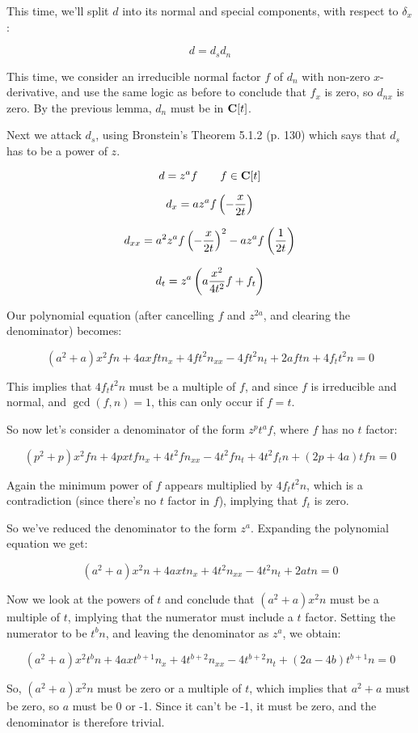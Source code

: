 \documentclass{article}
\newcommand{\C}{\ensuremath{{\bf C}}}
\begin{document}
This time, we'll split $d$ into its normal and special components,
with respect to $\delta_x$:

$$d =d_s d_n$$

This time, we consider an irreducible normal factor $f$ of $d_n$ with
non-zero $x$-derivative, and use the same logic as before to conclude
that $f_x$ is zero, so $d_{nx}$ is zero.  By the previous lemma,
$d_{n}$ must be in $\C[t]$.

Next we attack $d_s$, using Bronstein's Theorem 5.1.2 (p. 130) which
says that $d_s$ has to be a power of $z$.

$$d=z^a f \qquad f \in \C[t]$$

$$d_x = a z^a f \left( - {x\over{2t}} \right)$$

$$d_{xx} = a^2 z^a f \left( - {x\over{2t}} \right)^2 - a z^a f \left( {1\over{2t}} \right)$$

$$d_t = z^a \left( a {x^2\over{4t^2}} f + f_t\right)$$

Our polynomial equation (after cancelling $f$ and $z^{2a}$, and clearing the denominator) becomes:

$$(a^{2} +a)x^{2}fn +4axftn_x +4ft^{2}n_{xx} -4ft^{2}n_t +2aftn +4f_tt^{2}n = 0$$

This implies that $4f_tt^{2}n$ must be a multiple of $f$, and since $f$ is irreducible and normal,
and $\gcd(f,n)=1$, this can only occur if $f=t$.

So now let's consider a denominator of the form $z^p t^a f$, where $f$ has no $t$ factor:

$$(p^{2} +p)x^{2}fn +4pxtfn_x +4t^{2}fn_{xx} -4t^{2}fn_t +4t^{2}f_tn +(2p +4a)tfn = 0$$

Again the minimum power of $f$ appears multiplied by $4f_tt^{2}n$, which is a contradiction
(since there's no $t$ factor in $f$), implying that $f_t$ is zero.

So we've reduced the denominator to the form $z^a$.  Expanding the polynomial equation we get:

$$(a^{2} +a)x^{2}n +4axtn_x +4t^{2}n_{xx} -4t^{2}n_t +2atn = 0$$

Now we look at the powers of $t$ and conclude that $(a^{2}
+a)x^{2}n$ must be a multiple of $t$, implying that the numerator
must include a $t$ factor.  Setting the numerator to be $t^b n$, and
leaving the denominator as $z^a$, we obtain:

$$(a^{2} +a)x^{2}t^{b}n +4axt^{b +1}n_x +4t^{b +2}n_{xx} -4t^{b +2}n_t +(2a -4b)t^{b +1}n = 0$$

So, $(a^{2} +a)x^{2}n$ must be zero or a multiple of $t$, which implies that $a^2+a$ must be
zero, so $a$ must be 0 or -1.  Since it can't be -1, it must be zero,
and the denominator is therefore trivial.
\end{document}
